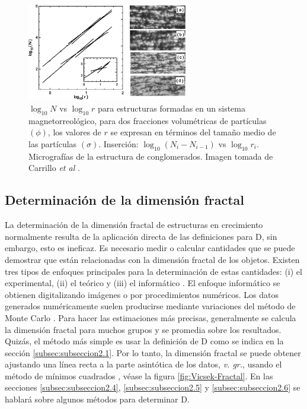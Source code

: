 \documentclass[11pt]{article}
\begin{document}
\begin{figure}[h!]
\vspace{1cm}
\centering
{\includegraphics[width=7cm]{Carrillo2006} \par}
\caption{ $\log_{10}N$ vs $\log_{10}r$ para estructuras formadas en un sistema magnetorreológico, para dos fracciones volumétricas de partículas $(\phi)$, los valores de $r$ se expresan en términos del tamaño medio de las partículas $(\sigma)$. Inserción: $\log_{10}(N_i - N_{i-1})$ vs $\log_{10} r_i$. Micrografías de la estructura de conglomerados. Imagen tomada de Carrillo \textit{et al} \cite{Carrillo2003}.}
\label{fig:Carrillo2003}
\end{figure}
 
\clearpage  
\subsection{Determinaci\'{o}n de la dimensi\'{o}n fractal}
\label{subsec:subseccion2.3}


La determinaci\'{o}n de la dimensi\'{o}n fractal de estructuras en crecimiento normalmente resulta de la aplicaci\'{o}n directa de las definiciones para D, sin embargo, esto es ineficaz. 
Es necesario medir o calcular cantidades que se puede demostrar que est\'{a}n relacionadas con la dimensi\'{o}n fractal de los objetos.
 Existen  tres tipos de enfoques principales para la determinaci\'{o}n de estas cantidades: (i) el experimental, (ii) el te\'{o}rico y (iii) el inform\'{a}tico \cite{Vicsek1992}. 
 El enfoque inform\'{a}tico se obtienen digitalizando im\'{a}genes o por procedimientos num\'{e}ricos. Los datos generados num\'{e}ricamente suelen producirse mediante variaciones del m\'{e}todo de Monte Carlo \cite{Mustafa1996}. 
 Para hacer las estimaciones m\'{a}s precisas, generalmente se calcula la dimensi\'{o}n fractal para muchos grupos y se promedia sobre los resultados. 
 Quiz\'{a}s, el m\'{e}todo m\'{a}s simple es usar la definici\'{o}n de  D como se indica en la secci\'{o}n \ref{subsec:subseccion2.1}. 
 Por lo tanto, la dimensi\'{o}n fractal se puede obtener ajustando una l\'{i}nea recta a la parte asint\'{o}tica de los datos, \textit{v. gr.}, usando el m\'{e}todo de m\'{i}nimos cuadrados \cite{Vicsek1992}, v\'{e}ase la figura \ref{fig:Vicsek-Fractal}. 
 En las secciones \ref{subsec:subseccion2.4}, \ref{subsec:subseccion2.5} y \ref{subsec:subseccion2.6} 
 se hablar\'{a} sobre algunos m\'{e}todos para determinar D. 
  
\end{document}
